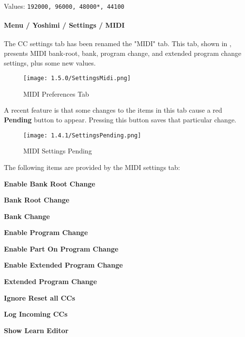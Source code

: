    Values: \texttt{192000, 96000, 48000*, 44100}

\paragraph{Menu / Yoshimi / Settings / MIDI}
\label{paragraph:menu_yoshimi_settings_ccs}

   The CC settings tab has been renamed the "MIDI" tab.
   This tab, shown in
   ,
   presents MIDI bank-root, bank, program change, and extended program
   change settings, plus some new values.

\begin{figure}[H]
   \centering 
   \texttt{[image: 1.5.0/SettingsMidi.png]}
   \caption[MIDI Preferences]{MIDI Preferences Tab}
   \label{fig:yoshimi_settings_cc}
\end{figure}

   A recent feature is that some changes to the items in this
   tab cause a red \textbf{Pending} button to appear.  Pressing this
   button saves that particular change.

\begin{figure}[H]
   \centering 
   \texttt{[image: 1.4.1/SettingsPending.png]}
   \caption[MIDI Settings Pending]{MIDI Settings Pending}
   \label{fig:yoshimi_settings_pending}
\end{figure}

   The following items are provided by the MIDI settings tab:

   \begin{enumber}
      \item \textbf{Enable Bank Root Change}
      \item \textbf{Bank Root Change}
      \item \textbf{Bank Change}
      \item \textbf{Enable Program Change}
      \item \textbf{Enable Part On Program Change}
      \item \textbf{Enable Extended Program Change}
      \item \textbf{Extended Program Change}
      \item \textbf{Ignore Reset all CCs}
      \item \textbf{Log Incoming CCs}
      \item \textbf{Show Learn Editor}
   \end{enumber}

